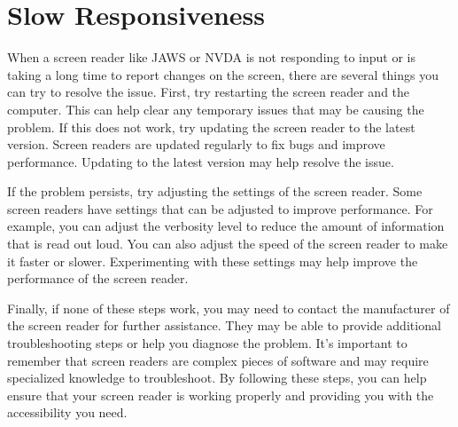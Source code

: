 \pagebreak \hypertarget{response}{}\section{Slow Responsiveness}\label{response}
When a screen reader like JAWS or NVDA is not responding to input or is taking a long time to report changes on the screen, there are several things you can try to resolve the issue. First, try restarting the screen reader and the computer. This can help clear any temporary issues that may be causing the problem. If this does not work, try updating the screen reader to the latest version. Screen readers are updated regularly to fix bugs and improve performance. Updating to the latest version may help resolve the issue.

If the problem persists, try adjusting the settings of the screen reader. Some screen readers have settings that can be adjusted to improve performance. For example, you can adjust the verbosity level to reduce the amount of information that is read out loud. You can also adjust the speed of the screen reader to make it faster or slower. Experimenting with these settings may help improve the performance of the screen reader.

Finally, if none of these steps work, you may need to contact the manufacturer of the screen reader for further assistance. They may be able to provide additional troubleshooting steps or help you diagnose the problem. It’s important to remember that screen readers are complex pieces of software and may require specialized knowledge to troubleshoot. By following these steps, you can help ensure that your screen reader is working properly and providing you with the accessibility you need.

